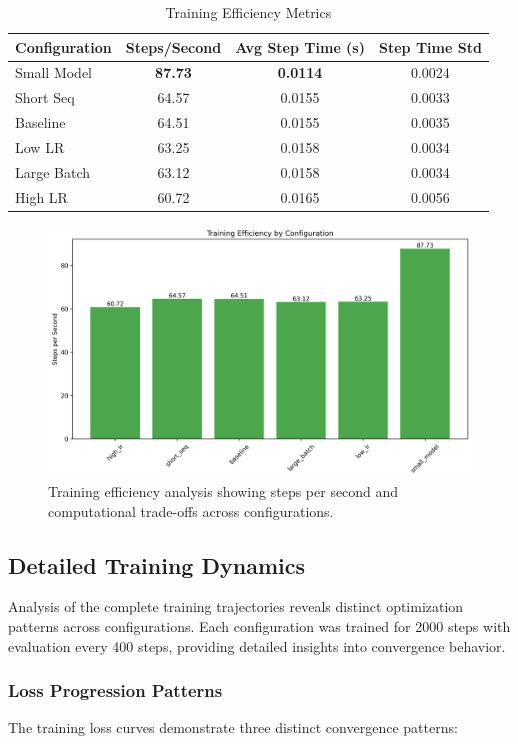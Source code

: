 \documentclass[11pt,a4paper]{article}
\begin{document}
\begin{table}[H]
\centering
\caption{Training Efficiency Metrics}
\label{tab:efficiency}
\begin{tabular}{@{}lccc@{}}
\toprule
Configuration & Steps/Second & Avg Step Time (s) & Step Time Std \\
\midrule
Small Model & \textbf{87.73} & \textbf{0.0114} & 0.0024 \\
Short Seq & 64.57 & 0.0155 & 0.0033 \\
Baseline & 64.51 & 0.0155 & 0.0035 \\
Low LR & 63.25 & 0.0158 & 0.0034 \\
Large Batch & 63.12 & 0.0158 & 0.0034 \\
High LR & 60.72 & 0.0165 & 0.0056 \\
\bottomrule
\end{tabular}
\end{table}

\begin{figure}[H]
    \centering
    \includegraphics[width=\linewidth]{research/efficiency_analysis.png}
    \caption{Training efficiency analysis showing steps per second and computational trade-offs across configurations.}
    \label{fig:efficiency}
\end{figure}

\subsection{Detailed Training Dynamics}
Analysis of the complete training trajectories reveals distinct optimization patterns across configurations. Each configuration was trained for 2000 steps with evaluation every 400 steps, providing detailed insights into convergence behavior.

\subsubsection{Loss Progression Patterns}
The training loss curves demonstrate three distinct convergence patterns:
\end{document}
